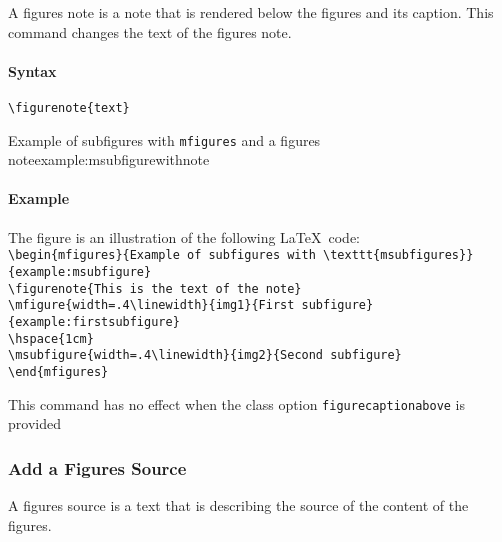 \documentclass[book,taskpackage,specpackage,codepackage]{upmethodology-document}
\begin{document}
A figures note is a note that is rendered below the figures and its caption.
This command changes the text of the figures note.

\paragraph{Syntax} \texttt{{\textbackslash}figurenote\{text\}}

\begin{mfigures}{Example of subfigures with \texttt{mfigures} and a figures note}{example:msubfigurewithnote}
	\hspace{1cm}
\end{mfigures}


\paragraph{Example} The figure  is an illustration of the following \LaTeX\ code: \\
\texttt{{\textbackslash}begin\{mfigures\}\{Example of subfigures with {\textbackslash}texttt\{msubfigures\}\}\{example:msubfigure\}}\\
\texttt{{\textbackslash}figurenote\{This is the text of the note\}}\\
\texttt{{\textbackslash}mfigure\{width=.4{\textbackslash}linewidth\}\{img1\}\{First subfigure\}\{example:firstsubfigure\}} \\
\texttt{{\textbackslash}hspace\{1cm\}} \\
\texttt{{\textbackslash}msubfigure\{width=.4{\textbackslash}linewidth\}\{img2\}\{Second subfigure\}} \\
\texttt{{\textbackslash}end\{mfigures\}}

\begin{upmcaution}
	This command has no effect when the class option \texttt{figurecaptionabove} is provided
\end{upmcaution}

\subsubsection{Add a Figures Source}

A figures source is a text that is describing the source of the content of the figures.
\end{document}
